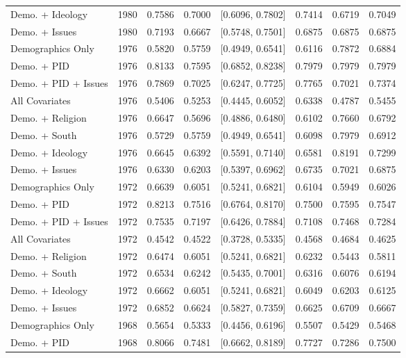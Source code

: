 \begin{longtable}{lrrrlrrr}
  Demo. + Ideology & 1980 & 0.7586 & 0.7000 & [0.6096, 0.7802] & 0.7414 & 0.6719 & 0.7049 \\ 
  Demo. + Issues & 1980 & 0.7193 & 0.6667 & [0.5748, 0.7501] & 0.6875 & 0.6875 & 0.6875 \\ 
  Demographics Only & 1976 & 0.5820 & 0.5759 & [0.4949, 0.6541] & 0.6116 & 0.7872 & 0.6884 \\ 
  Demo. + PID & 1976 & 0.8133 & 0.7595 & [0.6852, 0.8238] & 0.7979 & 0.7979 & 0.7979 \\ 
  Demo. + PID + Issues & 1976 & 0.7869 & 0.7025 & [0.6247, 0.7725] & 0.7765 & 0.7021 & 0.7374 \\ 
  All Covariates & 1976 & 0.5406 & 0.5253 & [0.4445, 0.6052] & 0.6338 & 0.4787 & 0.5455 \\ 
  Demo. + Religion & 1976 & 0.6647 & 0.5696 & [0.4886, 0.6480] & 0.6102 & 0.7660 & 0.6792 \\ 
  Demo. + South & 1976 & 0.5729 & 0.5759 & [0.4949, 0.6541] & 0.6098 & 0.7979 & 0.6912 \\ 
  Demo. + Ideology & 1976 & 0.6645 & 0.6392 & [0.5591, 0.7140] & 0.6581 & 0.8191 & 0.7299 \\ 
  Demo. + Issues & 1976 & 0.6330 & 0.6203 & [0.5397, 0.6962] & 0.6735 & 0.7021 & 0.6875 \\ 
  Demographics Only & 1972 & 0.6639 & 0.6051 & [0.5241, 0.6821] & 0.6104 & 0.5949 & 0.6026 \\ 
  Demo. + PID & 1972 & 0.8213 & 0.7516 & [0.6764, 0.8170] & 0.7500 & 0.7595 & 0.7547 \\ 
  Demo. + PID + Issues & 1972 & 0.7535 & 0.7197 & [0.6426, 0.7884] & 0.7108 & 0.7468 & 0.7284 \\ 
  All Covariates & 1972 & 0.4542 & 0.4522 & [0.3728, 0.5335] & 0.4568 & 0.4684 & 0.4625 \\ 
  Demo. + Religion & 1972 & 0.6474 & 0.6051 & [0.5241, 0.6821] & 0.6232 & 0.5443 & 0.5811 \\ 
  Demo. + South & 1972 & 0.6534 & 0.6242 & [0.5435, 0.7001] & 0.6316 & 0.6076 & 0.6194 \\ 
  Demo. + Ideology & 1972 & 0.6662 & 0.6051 & [0.5241, 0.6821] & 0.6049 & 0.6203 & 0.6125 \\ 
  Demo. + Issues & 1972 & 0.6852 & 0.6624 & [0.5827, 0.7359] & 0.6625 & 0.6709 & 0.6667 \\ 
  Demographics Only & 1968 & 0.5654 & 0.5333 & [0.4456, 0.6196] & 0.5507 & 0.5429 & 0.5468 \\ 
  Demo. + PID & 1968 & 0.8066 & 0.7481 & [0.6662, 0.8189] & 0.7727 & 0.7286 & 0.7500 \\ 

\end{longtable}
